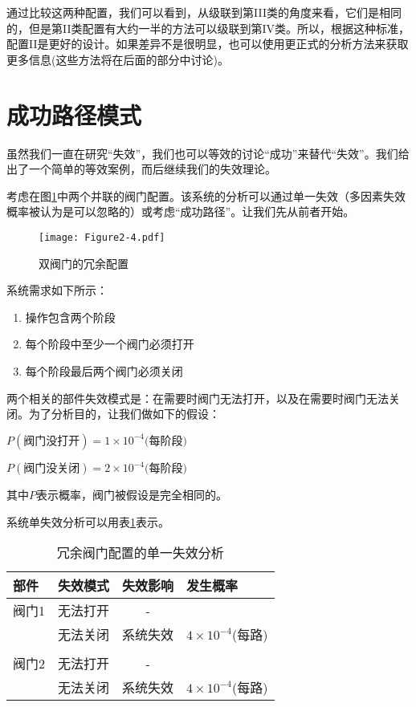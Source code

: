 \documentclass[cn,11pt,chinese]{elegantbook}
\begin{document}
通过比较这两种配置，我们可以看到，从级联到第III类的角度来看，它们是相同的，但是第II类配置有大约一半的方法可以级联到第IV类。所以，根据这种标准，配置II是更好的设计。如果差异不是很明显，也可以使用更正式的分析方法来获取更多信息(这些方法将在后面的部分中讨论)。

\section{成功路径模式}

虽然我们一直在研究“失效”，我们也可以等效的讨论“成功”来替代“失效”。我们给出了一个简单的等效案例，而后继续我们的失效理论。


考虑在图\ref{fig:fig2_4}中两个并联的阀门配置。该系统的分析可以通过单一失效（多因素失效概率被认为是可以忽略的）或考虑“成功路径”。让我们先从前者开始。

\begin{figure}[h]
	\centering
	\texttt{[image: Figure2-4.pdf]}
	\caption{双阀门的冗余配置}\label{fig:fig2_4}
\end{figure}

系统需求如下所示：

\begin{enumerate}
	\item 操作包含两个阶段
	\item 每个阶段中至少一个阀门必须打开
	\item 每个阶段最后两个阀门必须关闭
\end{enumerate}


两个相关的部件失效模式是：在需要时阀门无法打开，以及在需要时阀门无法关闭。为了分析目的，让我们做如下的假设：

$P(\mbox{阀门没打开}) = 1 \times 10^{-4}\mbox{(每阶段)}$

$P(\mbox{阀门没关闭}) = 2 \times 10^{-4}\mbox{(每阶段)}$

其中$P$表示概率，阀门被假设是完全相同的。

系统单失效分析可以用表\ref{tab:tab2_6}表示。


\begin{table}[htpb]
	\centering
	\caption{冗余阀门配置的单一失效分析}\label{tab:tab2_6}
	\begin{tabular}{@{}llll@{}}
		\toprule
		部件  & 失效模式 & 失效影响                  & 发生概率                 \\ \midrule
		阀门1 & 无法打开 & \multicolumn{1}{c}{-} &                      \\
		& 无法关闭 & 系统失效                  & $4\times10^{-4}$(每路) \\
		&      &                       &                      \\
		阀门2 & 无法打开 & \multicolumn{1}{c}{-} &                      \\
		& 无法关闭 & 系统失效                  & $4\times10^{-4}$(每路) \\ \bottomrule
	\end{tabular}
\end{table}
\end{document}
